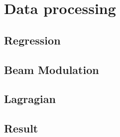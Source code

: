 \section{Data processing}

\subsection{Regression}

\subsection{Beam Modulation}

\subsection{Lagragian}

\subsection{Result}
